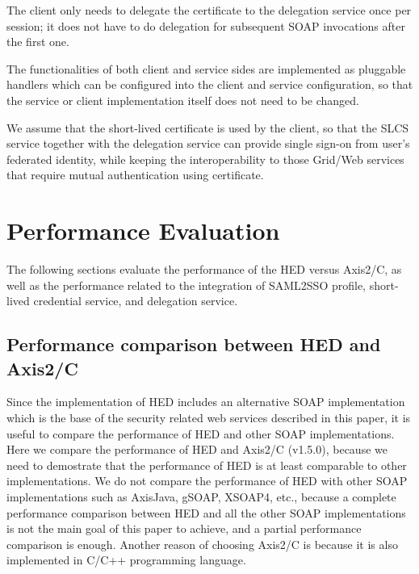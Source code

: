 \documentclass[conference]{IEEEtran}
\begin{document}
The client only needs to delegate the certificate to the delegation service once
per session; it does not have to do delegation for subsequent SOAP invocations after the first one.

The functionalities of both client and service sides are implemented as
pluggable handlers which can be configured into the client and service configuration, so that the service or
client implementation itself does not need to be changed.

We assume that the short-lived certificate is used by the client, so that the
SLCS service together with the delegation service can provide single sign-on from user's federated
identity, while keeping the interoperability to those Grid/Web services that require mutual authentication
using certificate.

\section{Performance Evaluation}
\label{sec:perfeval}
The following sections evaluate the performance of the HED versus Axis2/C, as 
well as the performance related to the integration of SAML2SSO profile, 
short-lived credential service, and delegation service.

\subsection{Performance comparison between HED and Axis2/C}
\label{sec:perhedandaxis}
Since the implementation of HED includes an alternative SOAP implementation
which is the base of the security related web services described in this paper, it is useful to
compare the performance of HED and other SOAP implementations. Here we compare 
the performance of HED and Axis2/C (v1.5.0), because we need to demostrate that the performance of HED
is at least comparable to other implementations. We do not compare the performance of HED 
with other SOAP implementations such as AxisJava, gSOAP, XSOAP4, etc., because a complete 
performance comparison between HED and all the other SOAP implementations is not the main 
goal of this paper to achieve, and a partial performance comparison is enough. Another reason
of choosing Axis2/C is because it is also implemented in C/C++ programming language.
\end{document}
